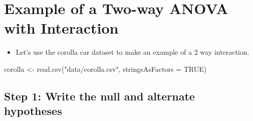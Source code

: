 \documentclass[
  letterpaper,
  DIV=11,
  numbers=noendperiod]{scrreprt}
\newenvironment{Shaded}{\begin{snugshade}}{\end{snugshade}}
\newcommand{\AttributeTok}[1]{\textcolor[rgb]{0.40,0.45,0.13}{#1}}
\newcommand{\ConstantTok}[1]{\textcolor[rgb]{0.56,0.35,0.01}{#1}}
\newcommand{\FunctionTok}[1]{\textcolor[rgb]{0.28,0.35,0.67}{#1}}
\newcommand{\NormalTok}[1]{\textcolor[rgb]{0.00,0.23,0.31}{#1}}
\newcommand{\OtherTok}[1]{\textcolor[rgb]{0.00,0.23,0.31}{#1}}
\newcommand{\StringTok}[1]{\textcolor[rgb]{0.13,0.47,0.30}{#1}}
\providecommand{\tightlist}{%
  \setlength{\itemsep}{0pt}\setlength{\parskip}{0pt}}\usepackage{longtable,booktabs,array}
\begin{document}
\section{Example of a Two-way ANOVA with
Interaction}\label{example-of-a-two-way-anova-with-interaction}

\begin{itemize}
\tightlist
\item
  Let's use the corolla car dataset to make an example of a 2 way
  interaction.
\end{itemize}

\begin{Shaded}
\begin{Highlighting}[]
\NormalTok{corolla }\OtherTok{\textless{}{-}} \FunctionTok{read.csv}\NormalTok{(}\StringTok{"data/corolla.csv"}\NormalTok{, }\AttributeTok{stringsAsFactors =} \ConstantTok{TRUE}\NormalTok{)}
\end{Highlighting}
\end{Shaded}

\subsection{Step 1: Write the null and alternate
hypotheses}\label{step-1-write-the-null-and-alternate-hypotheses}
\end{document}
